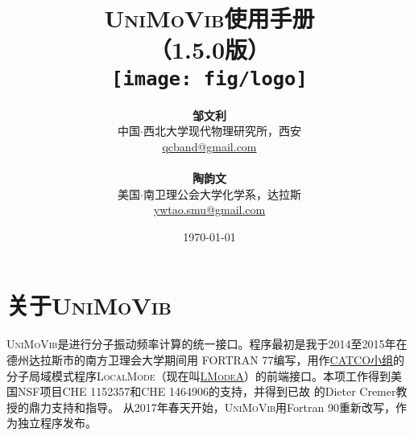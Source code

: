 \documentclass[12pt,a4paper,openany,twoside,cap,UTF8]{ctexbook}
\begin{document}

\title{
\vspace{-3cm}
\hei\textsc{UniMoVib}使用手册  \\
\vspace{1cm} （1.5.0版）\vspace{20 mm} \\
\texttt{[image: fig/logo]} \vspace{10 mm}}

\author{
\textbf{邹文利} \\
中国$\cdot$西北大学现代物理研究所，西安  \\
\href{mailto:qcband@gmail.com}{qcband@gmail.com}
\\ \\
\textbf{陶韵文} \\
美国$\cdot$南卫理公会大学化学系，达拉斯  \\
\href{mailto:ywtao.smu@gmail.com}{ywtao.smu@gmail.com}
}

\date{\vspace{1cm}  \today}
\maketitle

\setcounter{page}{1}   %
\renewcommand\contentsname{目\qquad 录}
\makeatletter
\let\ps@plain\ps@empty
\makeatother
\tableofcontents            %

\mainmatter
\chapter{关于\textsc{UniMoVib}}
\label{part:about}

\textsc{UniMoVib}是进行分子振动频率计算的统一接口。程序最初是我于2014至2015年在德州达拉斯市的南方卫理会大学期间用 FORTRAN 77编写，用作\href{https://sites.smu.edu/dedman/catco/}{CATCO小组}的分子局域模式程序\textsc{LocalMode}（现在叫\href{https://sites.smu.edu/dedman/catco/}{\textsc{LModeA}}）的前端接口。本项工作得到美国NSF项目CHE 1152357和CHE 1464906的支持，并得到已故 的Dieter Cremer教授的鼎力支持和指导。
从2017年春天开始，\textsc{UniMoVib}用Fortran 90重新改写，作为独立程序发布。
\end{document}
